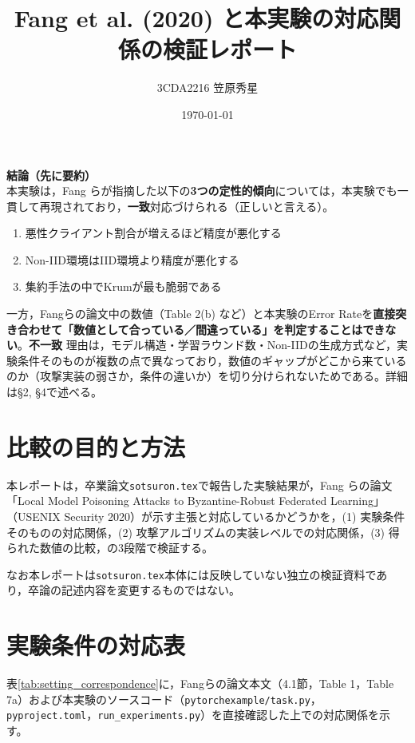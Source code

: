 \documentclass[a4j, twocolumn, dvipdfmx]{jsarticle}
\title{
Fang et al. (2020) と本実験の対応関係の検証レポート
}
\author{3CDA2216 笠原秀星}
\date{\today}
\newcommand{\okmark}{\textcolor{okgreen}{\textbf{一致}}}
\newcommand{\ngmark}{\textcolor{warnred}{\textbf{不一致}}}
\begin{document}
\maketitle

\begin{framed}
\noindent\textbf{結論（先に要約）}\\[2pt]
本実験は，Fang ら\cite{fang2020local}が指摘した以下の\textbf{3つの定性的傾向}については，本実験でも一貫して再現されており，\okmark{}対応づけられる（正しいと言える）。
\begin{enumerate}[leftmargin=1.4em]
  \item 悪性クライアント割合が増えるほど精度が悪化する
  \item Non-IID環境はIID環境より精度が悪化する
  \item 集約手法の中でKrumが最も脆弱である
\end{enumerate}
一方，Fangらの論文中の数値（Table 2(b) など）と本実験のError Rateを\textbf{直接突き合わせて「数値として合っている／間違っている」を判定することはできない}。\ngmark{}
理由は，モデル構造・学習ラウンド数・Non-IIDの生成方式など，実験条件そのものが複数の点で異なっており，数値のギャップがどこから来ているのか（攻撃実装の弱さか，条件の違いか）を切り分けられないためである。詳細は\S 2, \S 4で述べる。
\end{framed}

\section{比較の目的と方法}

本レポートは，卒業論文\texttt{sotsuron.tex}で報告した実験結果が，Fang ら\cite{fang2020local}の論文「Local Model Poisoning Attacks to Byzantine-Robust Federated Learning」（USENIX Security 2020）が示す主張と対応しているかどうかを，(1) 実験条件そのものの対応関係，(2) 攻撃アルゴリズムの実装レベルでの対応関係，(3) 得られた数値の比較，の3段階で検証する。

なお本レポートは\texttt{sotsuron.tex}本体には反映していない独立の検証資料であり，卒論の記述内容を変更するものではない。

\section{実験条件の対応表}

表\ref{tab:setting_correspondence}に，Fangらの論文本文（4.1節，Table 1，Table 7a）および本実験のソースコード（\texttt{pytorchexample/task.py}，\texttt{pyproject.toml}，\texttt{run\_experiments.py}）を直接確認した上での対応関係を示す。
\end{document}

